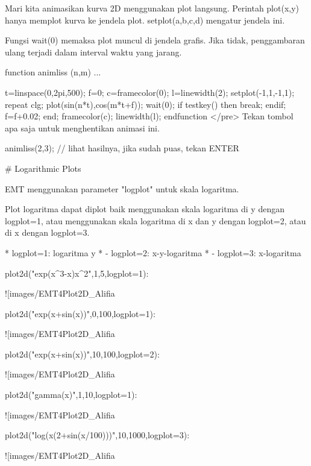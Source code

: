 \documentclass{article}
\begin{document}
Mari kita animasikan kurva 2D menggunakan plot langsung. Perintah
plot(x,y) hanya memplot kurva ke jendela plot. setplot(a,b,c,d)
mengatur jendela ini.


Fungsi wait(0) memaksa plot muncul di jendela grafis. Jika tidak,
penggambaran ulang terjadi dalam interval waktu yang jarang.


\>function animliss (n,m) ...


    t=linspace(0,2pi,500);
    f=0;
    c=framecolor(0);
    l=linewidth(2);
    setplot(-1,1,-1,1);
    repeat
      clg;
      plot(sin(n*t),cos(m*t+f));
      wait(0);
      if testkey() then break; endif;
      f=f+0.02;
    end;
    framecolor(c);
    linewidth(l);
    endfunction
</pre>
Tekan tombol apa saja untuk menghentikan animasi ini.


\>animliss(2,3); // lihat hasilnya, jika sudah puas, tekan ENTER


# Logarithmic Plots

EMT menggunakan parameter "logplot" untuk skala logaritma.


Plot logaritma dapat diplot baik menggunakan skala logaritma di y
dengan logplot=1, atau menggunakan skala logaritma di x dan y dengan
logplot=2, atau di x dengan logplot=3.


* 
logplot=1: logaritma y
*  - logplot=2: x-y-logaritma
*  - logplot=3: x-logaritma


\>plot2d("exp(x^3-x)\*x^2",1,5,logplot=1):


![images/EMT4Plot2D_Alifia%

\>plot2d("exp(x+sin(x))",0,100,logplot=1):


![images/EMT4Plot2D_Alifia%

\>plot2d("exp(x+sin(x))",10,100,logplot=2):


![images/EMT4Plot2D_Alifia%

\>plot2d("gamma(x)",1,10,logplot=1):


![images/EMT4Plot2D_Alifia%

\>plot2d("log(x\*(2+sin(x/100)))",10,1000,logplot=3):


![images/EMT4Plot2D_Alifia%
\end{document}
